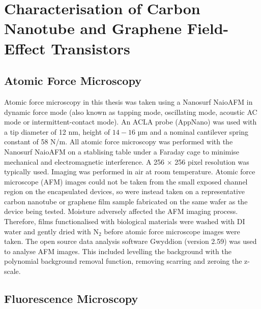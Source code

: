 \documentclass[
  a4paper,
]{scrbook}
\begin{document}
\hypertarget{characterisation-of-carbon-nanotube-and-graphene-field-effect-transistors}{%
\section{Characterisation of Carbon Nanotube and Graphene Field-Effect
Transistors}\label{characterisation-of-carbon-nanotube-and-graphene-field-effect-transistors}}

\hypertarget{sec-afm-characterisation}{%
\subsection{Atomic Force Microscopy}\label{sec-afm-characterisation}}

Atomic force microscopy in this thesis was taken using a Nanosurf
NaioAFM in dynamic force mode (also known as tapping mode, oscillating
mode, acoustic AC mode or intermittent-contact mode). An ACLA probe
(AppNano) was used with a tip diameter of 12 nm, height of \(14-16\) µm
and a nominal cantilever spring constant of 58 N/m. All atomic force
microscopy was performed with the Nanosurf NaioAFM on a stablising table
under a Faraday cage to minimise mechanical and electromagnetic
interference. A 256 \(\times\) 256 pixel resolution was typically used.
Imaging was performed in air at room temperature. Atomic force
microscope (AFM) images could not be taken from the small exposed
channel region on the encapsulated devices, so were instead taken on a
representative carbon nanotube or graphene film sample fabricated on the
same wafer as the device being tested. Moisture adversely affected the
AFM imaging process. Therefore, films functionalised with biological
materials were washed with DI water and gently dried with N\(_2\) before
atomic force microscope images were taken. The open source data analysis
software Gwyddion (version 2.59) was used to analyse AFM images. This
included levelling the background with the polynomial background removal
function, removing scarring and zeroing the z-scale.

\hypertarget{sec-fluorescence-characterisation}{%
\subsection{Fluorescence
Microscopy}\label{sec-fluorescence-characterisation}}
\end{document}
